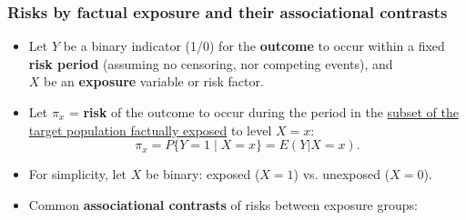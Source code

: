 \documentclass[12pt,dvipsnames,t,aspectratio=169, handout%
]{beamer}
\begin{document}
\begin{frame}
\frametitle{\large Risks by factual exposure and their associational contrasts}
 
\begin{itemize}
\item
Let %
 $Y$ %
 be a binary indicator (1/0)
for the {\bf outcome} to occur within a fixed {\bf risk period}
 (assuming no censoring, nor competing events), 
and \\ $X$ be an {\bf exposure} variable or risk factor. 
\pause
\medskip
\item
Let $\pi_x$ = {\bf risk} of the outcome to occur during the period in the
\underline{subset of the target population factually exposed} to level $X=x$:
$$ \pi_x = P \{ Y=1\mid X=x\} = E(Y|X=x) . $$
\pause
\item
For simplicity, let $X$ be binary: exposed ($X=1$) vs. unexposed ($X=0$). %
\pause
\medskip
\item
Common \textbf{associational contrasts}
of risks  between exposure groups:
\medskip
{}
\end{itemize}
\end{frame}
\end{document}
